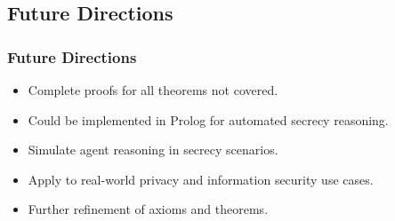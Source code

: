 \documentclass[aspectratio=169]{beamer}
\begin{document}
\subsection{Future Directions}
\begin{frame}
\frametitle{Future Directions}
\begin{itemize}
    \Large
    \item Complete proofs for all theorems not covered.
    \item Could be implemented in Prolog for automated secrecy reasoning.
    \item Simulate agent reasoning in secrecy scenarios.
    \item Apply to real-world privacy and information security use cases.
    \item Further refinement of axioms and theorems.
\end{itemize}
\end{frame}


\end{document}
